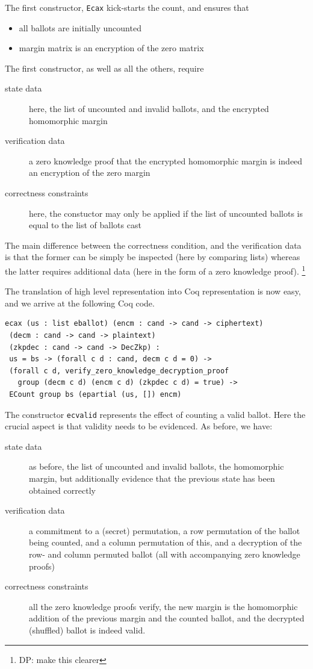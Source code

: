 \documentclass{llncs}
\begin{document}
The first constructor, \texttt{Ecax} kick-starts the count, and
ensures that 
\begin{itemize}
  \item all ballots are initially uncounted
  \item margin matrix is an encryption of the zero matrix
\end{itemize}
The first constructor, as well as all the others, require
\begin{description}
  \item[state data] here, the list of uncounted and invalid ballots,
  and the encrypted homomorphic margin
  \item[verification data] a zero knowledge proof that the encrypted
  homomorphic margin is indeed an encryption of the zero margin
  \item[correctness constraints] here, the constuctor may only be applied if
  the list of uncounted ballots is equal to the list of ballots cast
\end{description}

\noindent
The main difference between the correctness condition, and the
verification data is that the former can be simply be inspected
(here by comparing lists) whereas the latter requires additional
data (here  in the form of a zero knowledge proof).
\footnote{DP: make this clearer}


The translation of high level representation into Coq representation
is now easy, and we arrive at the following Coq code.
\begin{lstlisting}[frame=single,basicstyle=\ttfamily\footnotesize]
ecax (us : list eballot) (encm : cand -> cand -> ciphertext)
 (decm : cand -> cand -> plaintext) 
 (zkpdec : cand -> cand -> DecZkp) :
 us = bs -> (forall c d : cand, decm c d = 0) -> 
 (forall c d, verify_zero_knowledge_decryption_proof 
   group (decm c d) (encm c d) (zkpdec c d) = true) -> 
 ECount group bs (epartial (us, []) encm)
\end{lstlisting}


\noindent
The constructor \texttt{ecvalid} represents the effect of counting a
valid ballot. Here the crucial aspect is that validity needs to be
evidenced. As before, we have:
\begin{description}
  \item[state data] as before, the list of uncounted and invalid
  ballots, the homomorphic margin, but additionally evidence that
  the previous state has been obtained correctly
  \item[verification data]
  a commitment to a (secret) permutation, a row permutation of the
  ballot being counted, and a column permutation of this, and a
  decryption of the row- and column permuted ballot (all with
  accompanying zero knowledge proofs)
  \item[correctness constraints] all the zero knowledge proofs
  verify, the new margin is the homomorphic addition of the previous
  margin and the counted ballot, and the decrypted (shuffled)
  ballot is indeed valid.
\end{description}
\end{document}
